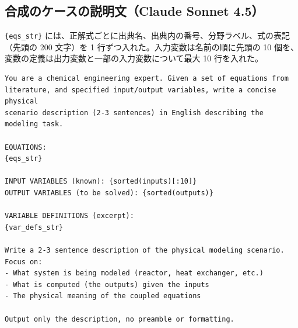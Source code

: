 \documentclass[11pt,a4paper]{ltjsarticle}
\begin{document}
\subsection{合成のケースの説明文（Claude Sonnet 4.5）}
\texttt{\{eqs\_str\}} には、正解式ごとに出典名、出典内の番号、分野ラベル、式の表記（先頭の 200 文字）を 1 行ずつ入れた。入力変数は名前の順に先頭の 10 個を、変数の定義は出力変数と一部の入力変数について最大 10 行を入れた。
\begin{Verbatim}[fontsize=\scriptsize, breaklines=true, frame=single]
You are a chemical engineering expert. Given a set of equations from
literature, and specified input/output variables, write a concise physical
scenario description (2-3 sentences) in English describing the modeling task.

EQUATIONS:
{eqs_str}

INPUT VARIABLES (known): {sorted(inputs)[:10]}
OUTPUT VARIABLES (to be solved): {sorted(outputs)}

VARIABLE DEFINITIONS (excerpt):
{var_defs_str}

Write a 2-3 sentence description of the physical modeling scenario. Focus on:
- What system is being modeled (reactor, heat exchanger, etc.)
- What is computed (the outputs) given the inputs
- The physical meaning of the coupled equations

Output only the description, no preamble or formatting.
\end{Verbatim}
\end{document}
